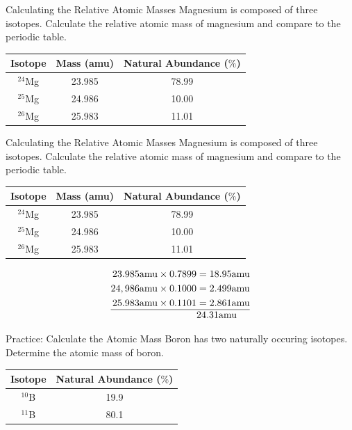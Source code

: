 \documentclass[11pt]{beamer}
\begin{document}
\begin{frame}{Calculating the Relative Atomic Masses}
  Magnesium is composed of three isotopes. Calculate the
  relative atomic mass of magnesium and compare to the periodic
  table.
  \begin{center}
  \begin{tabular}{ccc}
    Isotope & Mass (amu) & Natural Abundance ($\%$) \\
    \hline
    $^{24}$Mg & 23.985 & 78.99 \\
    $^{25}$Mg & 24.986 & 10.00 \\
    $^{26}$Mg & 25.983 & 11.01
  \end{tabular}
  \end{center}
\end{frame}

\begin{frame}{Calculating the Relative Atomic Masses}
  Magnesium is composed of three isotopes. Calculate the
  relative atomic mass of magnesium and compare to the periodic
  table.
  \begin{center}
  \begin{tabular}{ccc}
    Isotope & Mass (amu) & Natural Abundance ($\%$) \\
    \hline
    $^{24}$Mg & 23.985 & 78.99 \\
    $^{25}$Mg & 24.986 & 10.00 \\
    $^{26}$Mg & 25.983 & 11.01
  \end{tabular}
  \end{center}

  \begin{align*}
    23.985\text{amu}\times 0.7899 & =  18.95 \text{amu} \\
    24,986\text{amu}\times 0.1000 & =  2.499 \text{amu} \\
    25.983\text{amu}\times 0.1101 & =  2.861 \text{amu} \\
    \hline
    &   24.31 \text{amu}
  \end{align*}
\end{frame}

\begin{frame}{Practice: Calculate the Atomic Mass}
  Boron has two naturally occuring isotopes. Determine the
  atomic mass of boron.
  
  \begin{center}
  \begin{tabular}{cc}
    Isotope & Natural Abundance ($\%$) \\
    \hline
    $^{10}$B & 19.9 \\
    $^{11}$B & 80.1 
  \end{tabular}
  \end{center}
\end{frame}
\end{document}
